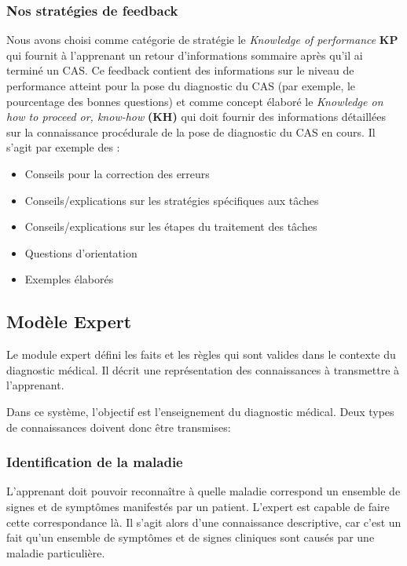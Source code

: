 \subsubsection{Nos stratégies de feedback}

Nous avons choisi comme catégorie de stratégie le \textit{Knowledge of performance} \textbf{KP} qui fournit à l'apprenant un retour d'informations sommaire après qu'il ai terminé un CAS. Ce feedback contient des informations sur le niveau de performance atteint pour la pose du diagnostic du CAS (par exemple, le pourcentage des bonnes questions) et comme concept élaboré le \textit{Knowledge on how to proceed or, know-how} \textbf{(KH)} \cite{narciss2008feedback} qui doit fournir des informations détaillées sur la connaissance procédurale de la pose de diagnostic du CAS en cours. Il s'agit par exemple des :
\begin{itemize}
    \item Conseils pour la correction des erreurs 
    \item Conseils/explications sur les stratégies spécifiques aux tâches
    \item Conseils/explications sur les étapes du traitement des tâches
    \item Questions d'orientation
    \item Exemples élaborés
\end{itemize}

    \subsection{Modèle Expert}
    Le module expert défini les faits et les règles qui sont valides dans le contexte du diagnostic médical. Il décrit une représentation des connaissances à transmettre à l'apprenant.
    
    Dans ce système, l'objectif est l'enseignement du diagnostic médical. 
    Deux types de connaissances doivent donc être transmises:

    
    \subsubsection{Identification de la maladie}
    L'apprenant doit pouvoir reconnaître à quelle maladie correspond un ensemble de signes et de symptômes manifestés par un patient. L'expert est capable de faire cette correspondance là. Il s'agit alors d'une connaissance descriptive, car c'est un fait qu'un ensemble de symptômes et de signes cliniques sont causés par une maladie particulière.
    
